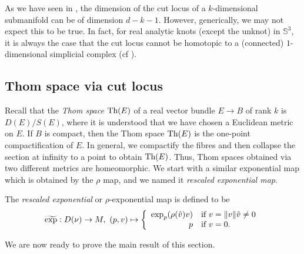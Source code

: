 \begin{rem}
    As we have seen in , the dimension of the cut locus of a $k$-dimensional submanifold can be of dimension $d-k-1$. However, generically, we may not expect this to be true. In fact, for real analytic knots (except the unknot) in $\mathbb{S}^3$, it is always the case that the cut locus cannot be homotopic to a (connected) $1$-dimensional simplicial complex (cf ). 
\end{rem}

\subsection{Thom space via cut locus}\label{Sec: Thom}
\hfb Recall that the \textit{Thom space}  $\textup{Th}(E)$ of a real vector bundle  $E\to B$ of rank $k$ is $D(E)/S(E)$, where it is understood that we have chosen a Euclidean metric on $E$. If $B$ is compact, then the Thom space $\textup{Th}(E)$ is the one-point compactification  of $E$. In general, we compactify the fibres and then collapse the section at infinity to a point to obtain $\textup{Th}(E)$. Thus, Thom spaces obtained via two different metrics are homeomorphic. We start with a similar exponential map which is obtained by the $\rho$ map, and we named it \textit{rescaled exponential map}.   

\begin{defn}
    The \textit{rescaled exponential} or $\rho$-exponential map is defined to be 
    \begin{displaymath}
        \widetilde{\textup{exp}}:D(\nu)\to M,\,\,(p,v)\mapsto \left\{
        \begin{array}{rl}
            \textup{exp}_p(\rho(\hat{v})v) & \textup{if $v=\|v\|\hat{v}\neq 0$}\\
            p & \textup{if $v=0$.}
        \end{array}\right.
    \end{displaymath}
\end{defn}

\vspace{0.3cm}
\noindent We are now ready to prove the main result of this section.

